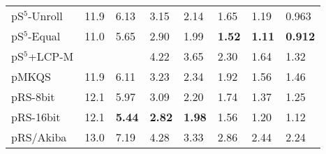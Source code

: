\documentclass[a4paper]{myjournal}
\begin{document}
\begin{table}
\begin{tabularx}{\linewidth}{l|*{7}{>{\hfill}X}|@{}}
pS$^5$-Unroll & 11.9 &     6.13 &     3.15 &     2.14 &     1.65 &     1.19 &     0.963 \\
 pS$^5$-Equal & 11.0 &     5.65 &     2.90 &     1.99 & \bf 1.52 & \bf 1.11 & \bf 0.912 \\
 pS$^5$+LCP-M &      &          &     4.22 &     3.65 &     2.30 &     1.64 &      1.32 \\
        pMKQS & 11.9 &     6.11 &     3.23 &     2.34 &     1.92 &     1.56 &      1.46 \\
     pRS-8bit & 12.1 &     5.97 &     3.09 &     2.20 &     1.74 &     1.37 &      1.25 \\
    pRS-16bit & 12.1 & \bf 5.44 & \bf 2.82 & \bf 1.98 &     1.56 &     1.20 &      1.12 \\
    pRS/Akiba & 13.0 &     7.19 &     4.28 &     3.33 &     2.86 &     2.44 &      2.24 \\ \hline
\end{tabularx}
\end{table}
\end{document}
